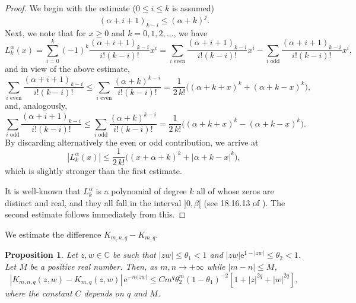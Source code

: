\documentclass{birkart}
\newtheorem{prop}[thm]{Proposition}
\theoremstyle{definition}
\theoremstyle{remark}
\numberwithin{equation}{section}
\numberwithin{figure}{section}
\newcommand{\e}{\mathrm e}
\newcommand{\1}{{\mathbf 1}}
\newcommand{\Rpar}{q}
\newcommand{\C}{{\mathbb C}}
\begin{document}
\begin{proof}
We begin with the estimate ($0\le i\le k$ is assumed)
\[
(\alpha+i+1)_{k-i}\le(\alpha+k)^j.
\]
Next, we note that for $x\ge0$ and $k=0,1,2,\ldots$, we have
\[
L^\alpha_k(x)=\sum_{i=0}^k(-1)^k\frac{(\alpha+i+1)_{k-i}}{i!(k-i)!}
x^i=\sum_{i\,\,\mathrm{even}}\frac{(\alpha+i+1)_{k-i}}{i!(k-i)!}
x^i-\sum_{i\,\,\mathrm{odd}}\frac{(\alpha+i+1)_{k-i}}{i!(k-i)!}
x^i,
\]
and in view of the above estimate,
\begin{equation*}
\sum_{i\,\,\mathrm{even}}\frac{(\alpha+i+1)_{k-i}}{i!(k-i)!}
\le \sum_{i\,\,\mathrm{even}}\frac{(\alpha+k)^{k-i}}{i!(k-i)!}
=\frac{1}{2\,k!}\big((\alpha+k+x)^k+(\alpha+k-x)^k\big),
\end{equation*}
and, analogously,
\begin{equation*}
\sum_{i\,\,\mathrm{odd}}\frac{(\alpha+i+1)_{k-i}}{i!(k-i)!}
\le \sum_{i\,\,\mathrm{odd}}\frac{(\alpha+k)^{k-i}}{i!(k-i)!}
=\frac{1}{2\,k!}\big((\alpha+k+x)^k-(\alpha+k-x)^k\big).
\end{equation*}
By discarding alternatively the even or odd contribution, we arrive at
\[
|L^\alpha_k(x)|\le\frac{1}{2\,k!}\big((x+\alpha+k)^k+|\alpha+k-x|^k\big),
\]
which is slightly stronger than the first estimate.

It is well-known that $L_k^\alpha$ is a polynomial of degree $k$ all of
whose zeros are distinct and real, and they all fall in the interval 
$]0,\beta[$ (see 18.16.13 of \cite{orthopo}). The second estimate follows 
immediately from this. 
\end{proof}
\medskip

 We estimate the difference $K_{m,n,\Rpar}-K_{m,\Rpar}$.

\begin{prop} 
\label{kernelestimate}
Let $z,w\in\C$ be such that $|zw|\le\theta_1<1$ and 
$|zw|\e^{1-|zw|}\le\theta_2<1$. Let $M$ be a positive real number. 
Then, as $m,n\to+\infty$ while $|m-n|\le M$,
\begin{equation*} 
|K_{m,n,\Rpar}(z,w)-K_{m,\Rpar}(z,w)| \,\e^{-m|zw|}
\le C m^{\Rpar}\theta_2^m(1-\theta_1)^{-2}[1+|z|^{2\Rpar}+|w|^{2\Rpar}], 
\end{equation*}
where the constant $C$ depends on $\Rpar$ and $M$.
\end{prop}
\end{document}
